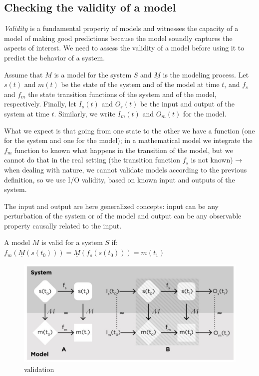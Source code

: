 \hypertarget{checking-the-validity-of-a-model}{%
\subsection{Checking the validity of a
model}\label{checking-the-validity-of-a-model}}

\emph{Validity} is a fundamental property of models and witnesses the
capacity of a model of making good predictions because the model soundly
captures the aspects of interest. We need to assess the validity of a
model before using it to predict the behavior of a system.

Assume that $M$ is a model for the system $S$ and $\underline{M}$ is the
modeling process. Let $s(t)$ and $m(t)$ be the state of the system and
of the model at time $t$, and $f_s$ and $f_m$ the state transition
functions of the system and of the model, respectively. Finally, let
$I_s(t)$ and $O_s(t)$ be the input and output of the system at time $t$.
Similarly, we write $I_m(t)$ and $O_m(t)$ for the model.

What we expect is that going from one state to the other we have a
function (one for the system and one for the model); in a mathematical
model we integrate the $f_m$ function to known what happens in the
transition of the model, but we cannot do that in the real setting (the
transition function $f_s$ is not known) → when dealing with nature, we
cannot validate models according to the previous definition, so we use
I/O validity, based on known input and outputs of the system.

The input and output are here generalized concepts: input can be any
perturbation of the system or of the model and output can be any
observable property causally related to the input.

A model $M$ is valid for a system $S$ if:
$f_m(\underline{M}(s(t_0))) = \underline{M}(f_s(s(t_0))) = m(t_1)$

\begin{figure}
\centering
\includegraphics[width=\textwidth]{validation.png}
\caption{validation}
\end{figure}

